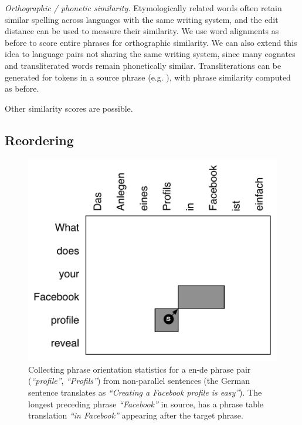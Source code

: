 \documentclass[11pt]{article}
\newcommand{\mnote}[1]{\marginpar{%
  \vskip-\baselineskip
  \raggedright\footnotesize
  \itshape\hrule\smallskip\tiny{#1}\par\smallskip\hrule}}
\newcommand{\mtodo}[1]{\mnote{\textcolor{red}{#1}}}
\newcommand{\secref}[1]{Section~\ref{#1}}
\newcommand{\emq}[1]{\emph{``#1''}}
\newcommand{\paraheader}[1]{\vskip 0.05in \noindent\emph{#1}}
\newcommand{\skipheader}{\vskip 0.05in}
\begin{document}
\paraheader{Orthographic / phonetic similarity.} Etymologically related words often retain similar spelling across languages with the same writing system, and the edit distance can be used to measure their similarity.  We use word alignments as before to score entire phrases for orthographic similarity.\mtodo{Not done quite the same as above but will glance over it.} We can also extend this idea to language pairs not sharing the same writing system, since many cognates and transliterated words remain phonetically similar.  Transliterations can be generated for tokens in a source phrase (e.g. \cite{Knight1997}), with phrase similarity computed as before.

Other similarity scores are possible.


\subsection{Reordering} \label{sect:order}

\begin{figure}[t]
\begin{center}
\includegraphics[width=0.8 \linewidth]{../figures/monoreord/monoreord.pdf}
\caption{Collecting phrase orientation statistics for a en-de phrase pair (\emq{profile}, \emq{Profils}) from non-parallel sentences (the German sentence translates as  \emq{Creating a Facebook profile is easy}). The longest preceding phrase \emq{Facebook} in source, has a phrase table translation \emq{in Facebook} appearing after the target phrase.}
\label{fig:monoreord}
\end{center}
\vskip -0.2in
\end{figure}
\end{document}
